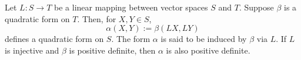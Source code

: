 Let $L: S \to T$ be a linear mapping between vector spaces $S$ and $T$. Suppose $\beta$ is a quadratic form on $T$. Then, for $X, Y \in S$,
$$\alpha(X, Y) := \beta(LX, LY)$$
defines a quadratic form on $S$. The form $\alpha$ is said to be induced by $\beta$ via $L$. If $L$ is injective and $\beta$ is positive definite, then $\alpha$ is also positive definite.
